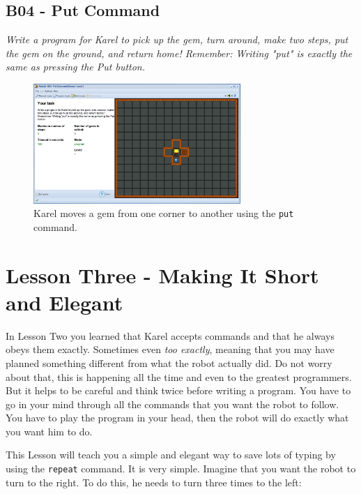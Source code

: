 \documentclass[article,A4,12pt]{llncs}
\begin{document}
\subsection{B04 - Put Command}

{\em Write a program for Karel to pick up the gem, turn around, make 
two steps, put the gem on the ground, and return home! Remember: 
Writing "put" is exactly the same as pressing the Put button.}

\begin{figure}[!ht]
\begin{center}
\includegraphics[width=0.7\textwidth]{img/b04.png}
\end{center}
\vspace{-4mm}
\caption{Karel moves a gem from one corner to another using the {\tt put} command.}
\label{fig:b04}
\vspace{-4mm}
\end{figure}
\noindent


\section{Lesson Three - Making It Short and Elegant}

In Lesson Two you learned that Karel accepts commands and that he always obeys 
them exactly. Sometimes even {\em too exactly}, meaning that you may have planned
something different from what the robot actually did. Do not worry about that, this
is happening all the time and even to the greatest programmers. But it helps to be careful and 
think twice before writing a program. You have to go in your mind through 
all the commands that you want the robot to follow. You have to play the program 
in your head, then the robot will do exactly what you want him to do. 

This Lesson will teach you a simple and elegant way to save lots of typing 
by using the {\tt repeat} command. It is very simple. Imagine that you want the
robot to turn to the right. To do this, he needs to turn three times to the left:
\end{document}
